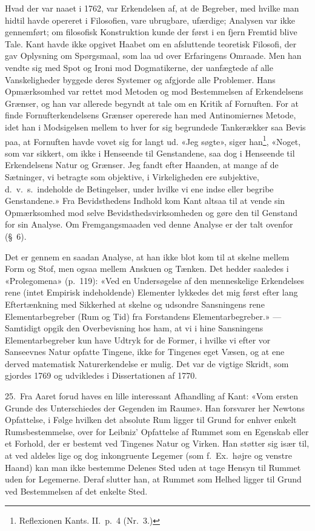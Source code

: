 \documentclass[12pt,a4paper]{article}
\newcommand{\apage}[1]{\marginnote{\footnotesize\textit{[#1]}}}
\begin{document}
Hvad der var naaet i 1762, var Erkendelsen af, at de Begreber, med hvilke
man hidtil havde opereret i Filosofien, vare ubrugbare, ufærdige;
Analysen var ikke gennemført; om filosofisk Konstruktion kunde der først
i en fjern Fremtid blive Tale. Kant havde ikke opgivet Haabet om en
afsluttende teoretisk Filosofi, der gav Oplysning om Spørgsmaal, som laa
ud over Erfaringens Omraade. Men han vendte sig med Spot og Ironi mod
Dogmatikerne, der uanfægtede af alle Vanskeligheder byggede deres
Systemer og afgjorde alle Problemer. Hans Opmærksomhed var rettet mod
Metoden og mod Bestemmelsen af Erkendelsens Grænser, og han var allerede
begyndt at tale om en Kritik af Fornuften. For at finde Fornufterkendelsens
Grænser opererede han med Antinomiernes Metode, idet han i Modsigelsen
mellem to hver for sig begrundede Tankerækker saa Bevis paa, at Fornuften
havde vovet sig for langt ud. «Jeg søgte», siger
han\footnote{Reflexionen Kants. II.\ p.\ 4 (Nr.\ 3.)}, «Noget,
som var sikkert, om ikke i Henseende til Genstandene, saa dog i Henseende
til Erkendelsens Natur og Grænser. Jeg fandt efter Haanden, at mange af
de Sætninger, vi betragte som objektive, i Virkeligheden ere subjektive,
d.\ v.\ s.\ indeholde de Betingelser, under hvilke vi ene indse eller
begribe Genstandene.» Fra Bevidsthedens Indhold kom Kant altsaa til at
vende sin Opmærksomhed mod selve Bevidsthedsvirksomheden og gøre den til
Genstand for sin Analyse. Om Fremgangsmaaden ved denne Analyse er der
talt ovenfor (§\ 6).

Det er gennem en saadan Analyse, at han ikke blot kom til at skelne
mellem Form og Stof, men ogsaa mellem Anskuen og Tænken. Det hedder
saaledes i «Prolegomena» (p.\ 119): «Ved en Undersøgelse af den
menneskelige Erkendelses rene (intet Empirisk indeholdende) Elementer
lykkedes det mig først efter lang Eftertænkning med Sikkerhed at skelne
og udsondre Sansningens rene Elementarbegreber (Rum og Tid) fra
Forstandens Elementarbegreber.» --- Samtidigt opgik den Overbevisning hos
ham, at vi i hine Sansningens Elementarbegreber kun have Udtryk for de
Former, i hvilke vi efter vor Sanseevnes Natur opfatte Tingene, ikke for
Tingenes eget Væsen, og at ene derved matematisk Naturerkendelse er
mulig. Det var de vigtige Skridt, som gjordes 1769 og udvikledes i
Dissertationen af 1770.

25.\ Fra Aaret forud haves en lille interessant Afhandling af Kant: «Vom
ersten \apage{48}  Grunde des Unterschiedes der Gegenden im Raume». Han forsvarer her
Newtons Opfattelse, i Følge hvilken det absolute Rum ligger til Grund for
enhver enkelt Rumsbestemmelse, over for Leibniz' Opfattelse af Rummet som
en Egenskab eller et Forhold, der er bestemt ved Tingenes Natur og
Virken. Han støtter sig især til, at ved aldeles lige og dog inkongruente
Legemer (som f.\ Ex.\ højre og venstre Haand) kan man ikke bestemme
Delenes Sted uden at tage Hensyn til Rummet uden for Legemerne. Deraf
slutter han, at Rummet som Helhed ligger til Grund ved Bestemmelsen af
det enkelte Sted.
\end{document}
